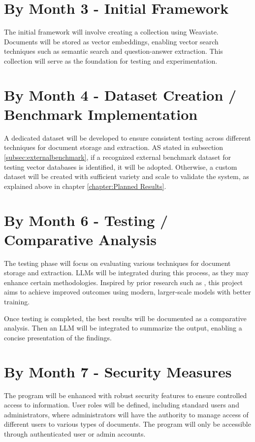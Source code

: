 \section{By Month 3 - Initial Framework}

The initial framework will involve creating a collection using Weaviate. Documents will be stored as vector embeddings, enabling vector search techniques such as semantic search and question-answer extraction. This collection will serve as the foundation for testing and experimentation.

\section{By Month 4 - Dataset Creation / Benchmark Implementation}
\label{sec:datasetcreation}
A dedicated dataset will be developed to ensure consistent testing across different techniques for document storage and extraction. AS stated in subsection \ref{subsec:externalbenchmark}, if a recognized external benchmark dataset  for testing vector databases is identified, it will be adopted. Otherwise, a custom dataset will be created with sufficient variety and scale to validate the system, as explained above in chapter \ref{chapter:Planned Results}.

\section{By Month 6 - Testing / Comparative Analysis}

The testing phase will focus on evaluating various techniques for document storage and extraction. \ac{LLM}s will be integrated during this process, as they may enhance certain methodologies. Inspired by prior research such as \cite{densepassageretrievalopendomainkarpukhin2020}, this project aims to achieve improved outcomes using modern, larger-scale models with better training.

Once testing is completed, the best results will be documented as a comparative analysis. Then an \ac{LLM} will be integrated to summarize the output, enabling a concise presentation of the findings.

\section{By Month 7 - Security Measures}

The program will be enhanced with robust security features to ensure controlled access to information. User roles will be defined, including standard users and administrators, where administrators will have the authority to manage access of different users to various types of documents. The program will only be accessible through authenticated user or admin accounts.

